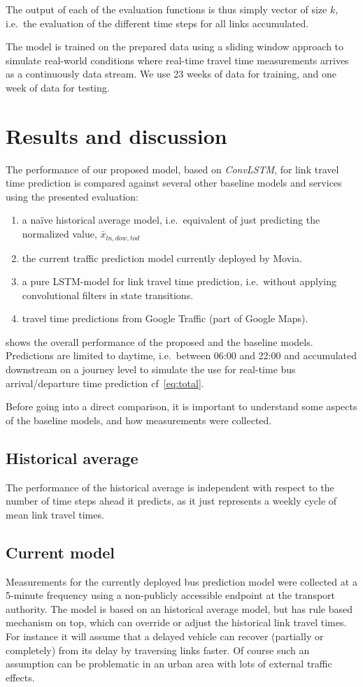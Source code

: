 \documentclass[preprint,11pt,5p,twocolumn]{elsarticle}
\begin{document}
The output of each of the evaluation functions is thus simply vector of size $k$, i.e.\ the evaluation of the different time steps for all links accumulated.

The model is trained on the prepared data using a sliding window approach to simulate real-world conditions where real-time travel time measurements arrives as a continuously data stream. We use 23 weeks of data for training, and one week of data for testing.

\section{Results and discussion}
\label{sec:results}
The performance of our proposed model, based on \emph{ConvLSTM}, for link travel time prediction is compared against several other baseline models and services using the presented evaluation:
\begin{enumerate}
   \item a naïve historical average model, i.e.\ equivalent of just predicting the normalized value, $\bar{x}_{\mathit{ln},\mathit{dow},\mathit{tod}}$ 
   \item the current traffic prediction model currently deployed by Movia.
   \item a pure LSTM-model for link travel time prediction, i.e.\ without applying convolutional filters in state transitions.
   \item travel time predictions from Google Traffic (part of Google Maps).
\end{enumerate}

 shows the overall performance of the proposed and the baseline models. Predictions are limited to daytime, i.e.\ between 06:00 and 22:00 and accumulated downstream on a journey level to simulate the use for real-time bus arrival/departure time prediction cf~\cref{eq:total}. 

Before going into a direct comparison, it is important to understand some aspects of the baseline models, and how measurements were collected.

\subsection{Historical average}
The performance of the historical average is independent with respect to the number of time steps ahead it predicts, as it just represents a weekly cycle of mean link travel times.

\subsection{Current model}
Measurements for the currently deployed bus prediction model were collected at a 5-minute frequency using a non-publicly accessible endpoint at the transport authority. The model is based on an historical average model, but has rule based mechanism on top, which can override or adjust the historical link travel times. For instance it will assume that a delayed vehicle can recover (partially or completely) from its delay by traversing links faster. Of course such an assumption can be problematic in an urban area with lots of external traffic effects. 
\end{document}

